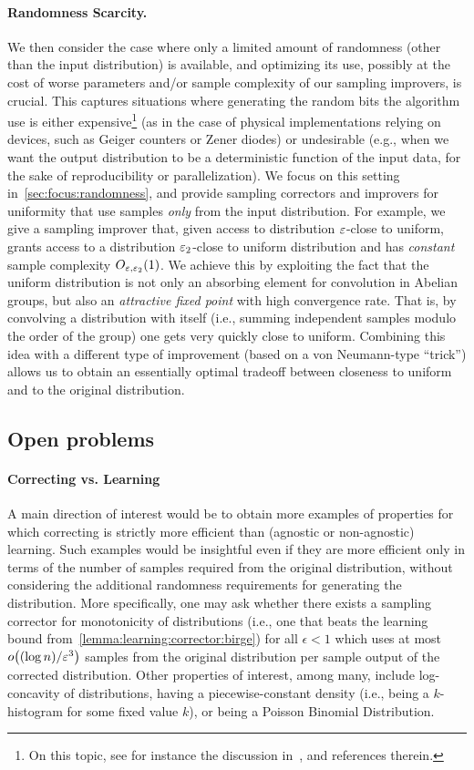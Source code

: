  \paragraph{Randomness Scarcity.}
We {then} consider the case where only a limited amount of randomness (other than the input distribution) is available, and optimizing its use, possibly at the cost of worse parameters and/or sample complexity of our sampling improvers, is crucial. This captures situations where generating the random bits the algorithm use is either expensive\footnote{On this topic, see for instance the discussion in~\cite{KR:94,IZ:89}, and references therein.} (as in the case of physical implementations relying on devices, such as Geiger counters or Zener diodes) or undesirable  (e.g., when we want the output distribution to be a deterministic function of the input data, for the sake of reproducibility or parallelization). We focus on this setting in~\cref{sec:focus:randomness}, and provide sampling correctors and improvers for uniformity that use samples \emph{only} from the input distribution. For example, we give a sampling improver that, given access to distribution $\varepsilon$-close to uniform, grants access to a distribution $\varepsilon_2$-close to uniform distribution and has \emph{constant} sample complexity $O_{\varepsilon, \varepsilon_2}(1)$. We achieve this by exploiting the fact that the uniform distribution is not only an absorbing element for convolution in Abelian groups, but also an \emph{attractive fixed point} with high convergence rate. That is, by convolving a distribution with itself (i.e., summing independent samples modulo the order of the group) one gets very quickly close to uniform. Combining this idea with a different type of improvement (based on a von Neumann-type ``trick'') allows us to obtain an essentially optimal tradeoff between closeness to uniform and to the original distribution. 


\subsection{Open problems}

\paragraph{Correcting vs. Learning}
A main direction of
interest would be to obtain more examples of 
properties for which correcting is strictly more efficient than 
(agnostic or non-agnostic) learning.   Such examples would be
insightful even if they are more efficient only
in terms of the number of samples 
required from the original distribution, 
without considering the additional randomness requirements for
generating the distribution.
More specifically, one may ask whether 
there exists a 
sampling corrector for 
monotonicity of 
distributions (i.e., one that beats the learning bound from~\cref{lemma:learning:corrector:birge})
for all $\epsilon<1$ which uses at most
$\littleO{(\log n)/\eps^3}$ samples from the original distribution per sample
output of the corrected distribution. {Other properties of interest, among many, include log-concavity of distributions, having a piecewise-constant density (i.e., being a $k$-histogram for some fixed value $k$), or being a Poisson Binomial Distribution.}

